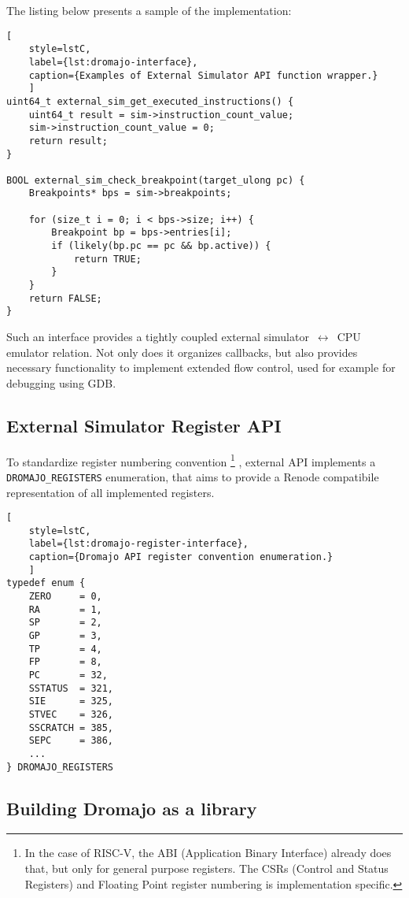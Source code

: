 \noindent
The listing below presents a sample of the implementation:

\begin{lstlisting}[
    style=lstC,
    label={lst:dromajo-interface},
    caption={Examples of External Simulator API function wrapper.}
    ]
uint64_t external_sim_get_executed_instructions() {
    uint64_t result = sim->instruction_count_value;
    sim->instruction_count_value = 0;
    return result;
}

BOOL external_sim_check_breakpoint(target_ulong pc) {
    Breakpoints* bps = sim->breakpoints;

    for (size_t i = 0; i < bps->size; i++) {
        Breakpoint bp = bps->entries[i];
        if (likely(bp.pc == pc && bp.active)) {
            return TRUE;
        }
    }
    return FALSE;
}
\end{lstlisting}

\noindent
Such an interface provides a tightly coupled external simulator\ $\leftrightarrow$\ CPU emulator relation. Not only does
it organizes callbacks, but also provides necessary functionality to implement extended flow control, used for example
for debugging using GDB.

\pagebreak

\subsection{External Simulator Register API}

To standardize register numbering convention%
\footnote{In the case of RISC-V, the ABI (Application Binary Interface)
already does that, but only for general purpose registers. The CSRs (Control and Status Registers) and Floating Point
register numbering is implementation specific.}%
, external API implements a \texttt{DROMAJO\_REGISTERS} enumeration, that aims to provide a Renode compatibile representation of
all implemented registers.

\begin{lstlisting}[
    style=lstC,
    label={lst:dromajo-register-interface},
    caption={Dromajo API register convention enumeration.}
    ]
typedef enum {
    ZERO     = 0,
    RA       = 1,
    SP       = 2,
    GP       = 3,
    TP       = 4,
    FP       = 8,
    PC       = 32,
    SSTATUS  = 321,
    SIE      = 325,
    STVEC    = 326,
    SSCRATCH = 385,
    SEPC     = 386,
    ...
} DROMAJO_REGISTERS
\end{lstlisting}

\subsection{Building Dromajo as a library}

